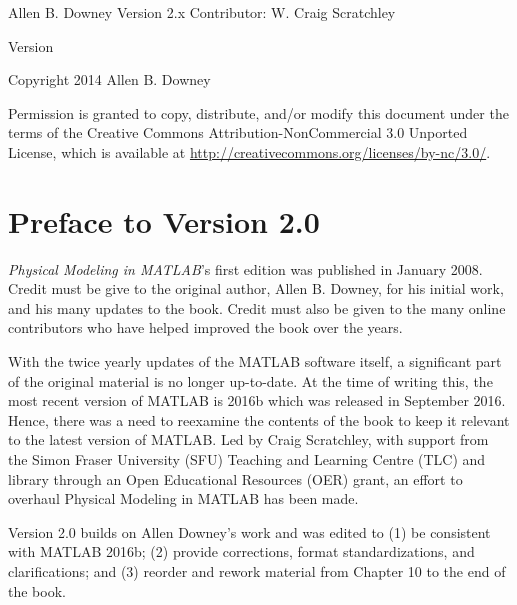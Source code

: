 \documentclass{book}
\begin{document}

\begin{htmlonly}


{\Large \thetitle}

{\large Allen B. Downey}
{\large Version 2.x Contributor:  W. Craig Scratchley}

Version \theversion

Copyright 2014 Allen B. Downey

\vspace{0.25in}

Permission is granted to copy, distribute, and/or modify this document
under the terms of the Creative Commons Attribution-NonCommercial 3.0
Unported License, which is available at
\url{http://creativecommons.org/licenses/by-nc/3.0/}.

\setcounter{chapter}{-1}

\end{htmlonly}
\chapter {Preface to Version 2.0}
 {\itshape Physical Modeling in MATLAB}'s first edition was published in
January 2008. Credit must be give to the original author, Allen B. Downey,
for his initial work, and his many updates to the book. Credit must also be
given to the many online contributors who have helped improved the book
over the years.

With the twice yearly updates of the MATLAB software itself, a significant
part of the original material is no longer up-to-date. At the time of writing
this, the most recent version of MATLAB is 2016b which was released in
September 2016. Hence, there was a need to reexamine the contents of
the book to keep it relevant to the latest version of MATLAB. Led by Craig
Scratchley, with support from the Simon Fraser University (SFU) Teaching
and Learning Centre (TLC) and library through an Open Educational
Resources (OER) grant, an effort to overhaul Physical Modeling in MATLAB
has been made.

Version 2.0 builds on Allen Downey's work and was edited to (1)
be consistent with MATLAB 2016b; (2) provide corrections, format
standardizations, and clarifications; and (3) reorder and rework material
from Chapter 10 to the end of the book.

\end{document}
